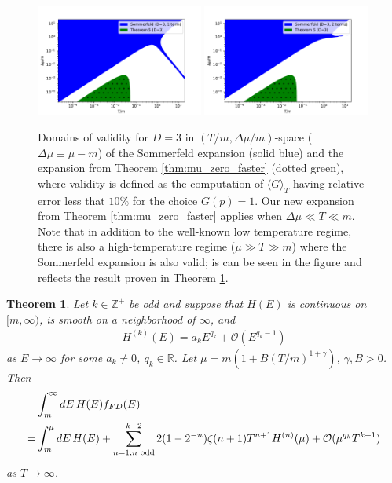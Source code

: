 \documentclass[sn-mathphys,Numbered]{sn-jnl}
\newtheorem{theorem}{Theorem}
\begin{document}
\begin{figure}
\centering
\includegraphics[width=0.49\textwidth]{./plot/Sommerfeld_vs_ours_regions_D3_1_term.pdf}
\includegraphics[width=0.49\textwidth]{./plot/Sommerfeld_vs_ours_regions_D3_2_terms.pdf}
\caption{Domains of validity for $D=3$ in $(T/m,\Delta\mu/m)$-space ($\Delta\mu\equiv\mu-m$) of the Sommerfeld expansion (solid blue) and the expansion from Theorem \ref{thm:mu_zero_faster} (dotted green), where validity is defined as the computation of $\langle G\rangle_T$ having relative error  less that $10\%$ for the choice  $G(p)=1$.  Our new expansion from Theorem \ref{thm:mu_zero_faster} applies when $\Delta\mu\ll T\ll m$.  Note that in addition to the well-known low temperature regime, there is also a high-temperature regime ($\mu\gg T\gg m$) where the Sommerfeld expansion is also valid; is can be seen in the figure and reflects the result  proven in Theorem \ref{thm:high_T_Sommerfeld}. }\label{fig:Thm3_vs_Sommerfeld_regions_terms_comp}
\end{figure}
\begin{theorem}\label{thm:high_T_Sommerfeld}
Let $k\in\mathbb{Z}^+$ be odd and suppose that $H(E)$ is continuous on $[m,\infty)$, is smooth on a neighborhood of $\infty$, and
\begin{align}
  H^{(k)}(E)=a_kE^{q_k}+\mathcal{O}(E^{q_k-1})  
\end{align}
as $E\to \infty$ for some $a_k\neq 0$, $q_k\in\mathbb{R}$.  Let $\mu=m(1+B(T/m)^{1+\gamma})$, $\gamma,B>0$. Then
\begin{align}
    &\int_m^\infty dE\, H(E)f_{FD}(E)\notag\\
=&\int_m^\mu dE\, H(E)+\sum_{n=1,n\text{ odd}}^{k-2} 2(1-2^{-n})\zeta(n+1)T^{n+1}H^{(n)}(\mu)+\mathcal{O}(\mu^{q_k}T^{k+1})\label{eq:Sommerfeld_high_temp_final}
\end{align}
as $T\to\infty$.
\end{theorem}
\end{document}
